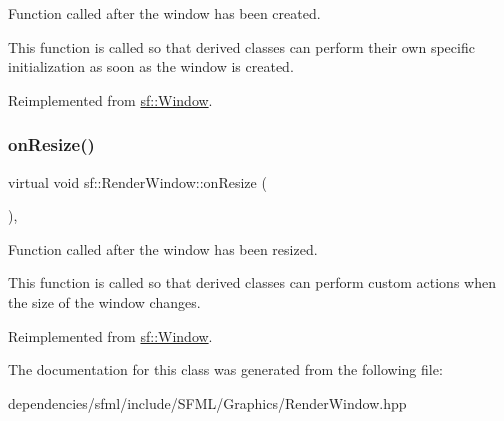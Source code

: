 Function called after the window has been created. 

This function is called so that derived classes can perform their own specific initialization as soon as the window is created. 

Reimplemented from \hyperlink{classsf_1_1_window_a106633b9be49b27f83d4712689b493eb}{sf\+::\+Window}.

\mbox{\label{classsf_1_1_render_window_a5c85fe482313562d33ffd24a194b6fef}} 
\subsubsection{\texorpdfstring{on\+Resize()}{onResize()}}
{\footnotesize\ttfamily virtual void sf\+::\+Render\+Window\+::on\+Resize (\begin{DoxyParamCaption}{ }\end{DoxyParamCaption})\hspace{0.3cm}{\ttfamily [protected]}, {\ttfamily [virtual]}}



Function called after the window has been resized. 

This function is called so that derived classes can perform custom actions when the size of the window changes. 

Reimplemented from \hyperlink{classsf_1_1_window_a10f567a387da7b49f417f73321fcf64d}{sf\+::\+Window}.



The documentation for this class was generated from the following file\+:\begin{DoxyCompactItemize}
\item 
dependencies/sfml/include/\+S\+F\+M\+L/\+Graphics/Render\+Window.\+hpp\end{DoxyCompactItemize}
